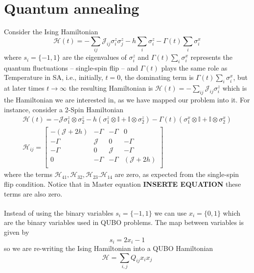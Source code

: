 \section{Quantum annealing}
Consider the Ising Hamiltonian
\begin{equation}
    \mathcal{H}(t) = -\sum_{ij}\mathcal{J}_{ij}\sigma_{i}^{z}\sigma_{j}^{z} - h\sum_{i}\sigma_{i}^{z} - \Gamma(t)\sum_{i}\sigma_{i}^{x}
\end{equation}
where $s_{i} = \{-1,1\}$ are the eigenvalues of $\sigma_{i}^{z}$ and $\Gamma(t)\sum_{i}\sigma_{i}^{x}$ represents the quantum fluctuations -- single-spin flip -- and $\Gamma(t)$ plays the same role as Temperature in SA, i.e., initially, $t=0$, the dominating term is $\Gamma(t)\sum_{i}\sigma_{i}^{x}$, but at later times $t \rightarrow \infty$ the resulting Hamiltonian is $\mathcal{H}(t) = -\sum_{ij}\mathcal{J}_{ij}\sigma_{i}^{z}$ which is the Hamiltonian we are interested in, as we have mapped our problem into it. For instance, consider a 2-Spin Hamiltonian
\begin{align}
    \mathcal{H}(t) = -\mathcal{J}\sigma_{1}^{z}\otimes \sigma_{2}^{z} - h\left(\sigma_{1}^{z}\otimes \mathbb{I} + \mathbb{I}\otimes \sigma_{2}^{z}\right) - \Gamma(t) \left(\sigma_{1}^{x}\otimes\mathbb{I} + \mathbb{I}\otimes \sigma_{2}^{x}\right)\\
    \mathcal{H}_{ij}= \begin{bmatrix}
        -\left(\mathcal{J} + 2h\right) & -\Gamma & -\Gamma & 0 \\
        -\Gamma & \mathcal{J} & 0 & -\Gamma \\
        -\Gamma & 0 & \mathcal{J} & -\Gamma \\
        0 & -\Gamma & -\Gamma & \left(\mathcal{J} + 2h\right) \\
    \end{bmatrix}
\end{align}
where the terms $\mathcal{H}_{41},\mathcal{H}_{32}, \mathcal{H}_{23}. \mathcal{H}_{14}$ are zero, as expected from the single-spin flip condition. Notice that in Master equation \textbf{INSERTE EQUATION} these terms are also zero.\\\\
Instead of using the binary variables $s_{i} = \{-1,1\}$ we can use $x_{i} = \{0,1\}$ which are the binary variables used in QUBO problems. The map between variables is given by
\begin{equation}
    s_{i} = 2x_{i} -1
\end{equation}
so we are re-writing the Ising Hamiltonian into a QUBO Hamiltonian
\begin{equation}
    \mathcal{H} = \sum_{i,j}Q_{ij}x_{i}x_{j}
\end{equation}

